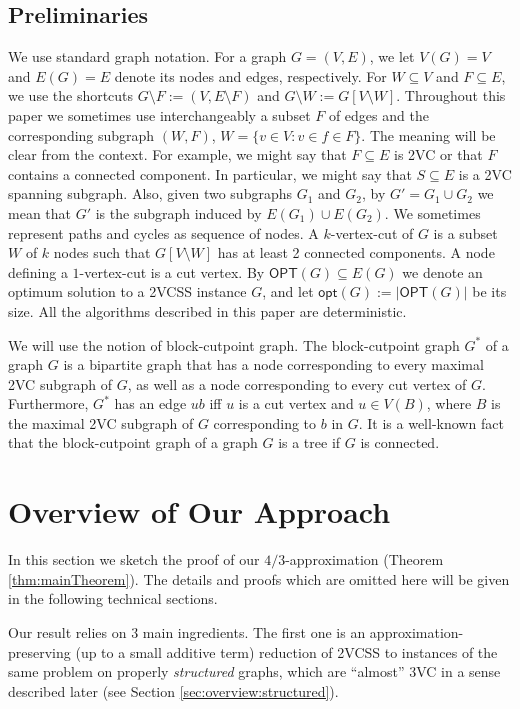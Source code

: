 \documentclass{article}
\newcommand{\OPT}{\mathsf{OPT}}
\newcommand{\opt}{\mathsf{opt}}
\begin{document}
\subsection{Preliminaries}\label{sec:preliminaries}

We use standard graph notation. For a graph $G=(V,E)$, we  let $V(G)=V$ and $E(G)=E$ denote its nodes and edges, respectively. For $W\subseteq V$ and $F\subseteq E$, we use the shortcuts $G\setminus F:=(V,E\setminus F)$ and $G\setminus W:=G[V\setminus W]$. Throughout this paper we sometimes use interchangeably a subset $F$ of edges and the corresponding subgraph $(W,F)$, $W=\{v\in V: v\in f\in F\}$. The meaning will be clear from the context. For example, we might say that $F\subseteq E$ is 2VC or that $F$ contains a connected component. In particular, we might say that $S\subseteq E$ is a 2VC spanning subgraph. Also, given two subgraphs $G_1$ and $G_2$, by $G'=G_1\cup G_2$ we mean that $G'$ is the subgraph induced by $E(G_1)\cup E(G_2)$. We sometimes represent paths and cycles as sequence of nodes. A $k$-vertex-cut of $G$ is a subset $W$ of $k$ nodes such that $G[V\setminus W]$ has at least 2 connected components. A node defining a $1$-vertex-cut is a cut vertex. By $\OPT(G)\subseteq E(G)$ we denote an optimum solution to a 2VCSS instance $G$, and let $\opt(G):=|\OPT(G)|$ be its size. All the algorithms described in this paper are deterministic.

We will use the notion of block-cutpoint graph. The block-cutpoint graph $G^*$ of a graph $G$ is a bipartite graph that has a node corresponding to every maximal 2VC subgraph of $G$, as well as a node corresponding to every cut vertex of $G$. Furthermore, $G^*$ has an edge $ub$ iff $u$ is a cut vertex and $u\in V(B)$, where $B$ is the maximal 2VC subgraph of $G$ corresponding to $b$ in $G$. It is a well-known fact~\cite[Chapter~3]{west2001introduction} that the block-cutpoint graph of a graph $G$ is a tree if $G$ is connected.

\section{Overview of Our Approach}
\label{sec:overview}

In this section we sketch the proof of our $4/3$-approximation (Theorem \ref{thm:mainTheorem}). The details and proofs which are omitted here will be given in the following technical sections. 

Our result relies on $3$ main ingredients. The first one is an approximation-preserving (up to a small additive term) reduction of 2VCSS to instances of the same problem on properly \emph{structured} graphs, which are ``almost'' 3VC in a sense described later (see Section \ref{sec:overview:structured}).
\end{document}

